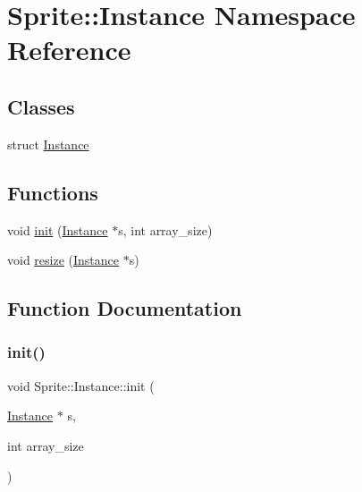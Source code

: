 \hypertarget{namespace_sprite_1_1_instance}{}\section{Sprite\+:\+:Instance Namespace Reference}
\label{namespace_sprite_1_1_instance}
\subsection*{Classes}
\begin{DoxyCompactItemize}
\item 
struct \mbox{\hyperlink{struct_sprite_1_1_instance_1_1_instance}{Instance}}
\end{DoxyCompactItemize}
\subsection*{Functions}
\begin{DoxyCompactItemize}
\item 
void \mbox{\hyperlink{namespace_sprite_1_1_instance_a866f75508ce3d8410854e7e12d16a270}{init}} (\mbox{\hyperlink{struct_sprite_1_1_instance_1_1_instance}{Instance}} $\ast$s, int array\+\_\+size)
\item 
void \mbox{\hyperlink{namespace_sprite_1_1_instance_a67cbda93595d925fc895a2af32de5fe9}{resize}} (\mbox{\hyperlink{struct_sprite_1_1_instance_1_1_instance}{Instance}} $\ast$s)
\end{DoxyCompactItemize}


\subsection{Function Documentation}
\mbox{\label{namespace_sprite_1_1_instance_a866f75508ce3d8410854e7e12d16a270}} 
\subsubsection{\texorpdfstring{init()}{init()}}
{\footnotesize\ttfamily void Sprite\+::\+Instance\+::init (\begin{DoxyParamCaption}\item[{\mbox{\hyperlink{struct_sprite_1_1_instance_1_1_instance}{Instance}} $\ast$}]{s,  }\item[{int}]{array\+\_\+size }\end{DoxyParamCaption})}

